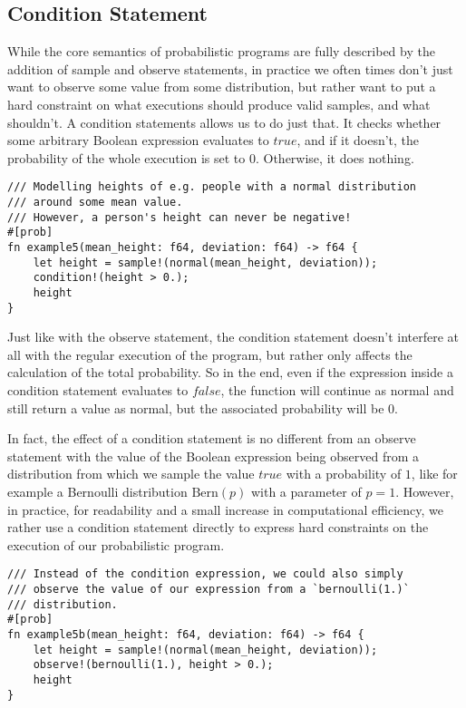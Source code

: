 \subsection{Condition Statement}

While the core semantics of probabilistic programs are fully described by the addition of sample and observe statements, in practice we often times don't just want to observe some value from some distribution, but rather want to put a hard constraint on what executions should produce valid samples, and what shouldn't. A condition statements allows us to do just that. It checks whether some arbitrary Boolean expression evaluates to $true$, and if it doesn't, the probability of the whole execution is set to $0$. Otherwise, it does nothing.

\begin{minipage}{\linewidth}
\begin{lstlisting}
/// Modelling heights of e.g. people with a normal distribution
/// around some mean value.
/// However, a person's height can never be negative!
#[prob]
fn example5(mean_height: f64, deviation: f64) -> f64 {
    let height = sample!(normal(mean_height, deviation));
    condition!(height > 0.);
    height
}
\end{lstlisting}
\end{minipage}

Just like with the observe statement, the condition statement doesn't interfere at all with the regular execution of the program, but rather only affects the calculation of the total probability. So in the end, even if the expression inside a condition statement evaluates to $false$, the function will continue as normal and still return a value as normal, but the associated probability will be $0$.

In fact, the effect of a condition statement is no different from an observe statement with the value of the Boolean expression being observed from a distribution from which we sample the value $true$ with a probability of $1$, like for example a Bernoulli distribution $\text{Bern}(p)$ with a parameter of $p=1$. However, in practice, for readability and a small increase in computational efficiency, we rather use a condition statement directly to express hard constraints on the execution of our probabilistic program.

\begin{minipage}{\linewidth}
\begin{lstlisting}
/// Instead of the condition expression, we could also simply
/// observe the value of our expression from a `bernoulli(1.)`
/// distribution.
#[prob]
fn example5b(mean_height: f64, deviation: f64) -> f64 {
    let height = sample!(normal(mean_height, deviation));
    observe!(bernoulli(1.), height > 0.);
    height
}
\end{lstlisting}
\end{minipage}


